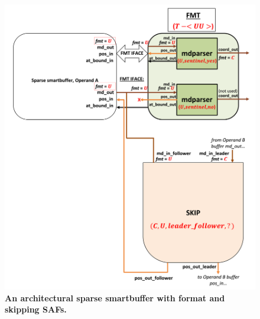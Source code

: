 \begin{figure}[H]
\includegraphics[width=\textwidth]{figures/safinference_build_09skipfmtattrs.png}
\caption{\textbf{An architectural sparse smartbuffer with format and skipping SAFs.}}
\label{fig:safinference_build_09skipfmtattrs}
\centering
\end{figure}



